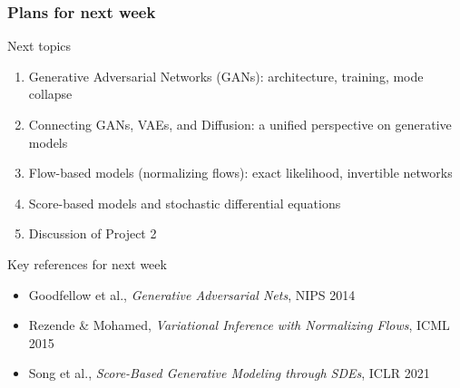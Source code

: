 \documentclass{beamer}
\begin{document}
\begin{frame}
\frametitle{Plans for next week}

\begin{block}{Next topics}
\begin{enumerate}
  \item Generative Adversarial Networks (GANs): architecture, training, mode collapse
  \item Connecting GANs, VAEs, and Diffusion: a unified perspective on generative models
  \item Flow-based models (normalizing flows): exact likelihood, invertible networks
  \item Score-based models and stochastic differential equations
  \item Discussion of Project 2
\end{enumerate}
\end{block}

\begin{block}{Key references for next week}
\begin{itemize}
  \item Goodfellow et al., \emph{Generative Adversarial Nets}, NIPS 2014
  \item Rezende \& Mohamed, \emph{Variational Inference with Normalizing Flows}, ICML 2015
  \item Song et al., \emph{Score-Based Generative Modeling through SDEs}, ICLR 2021
\end{itemize}
\end{block}
\end{frame}
\end{document}
